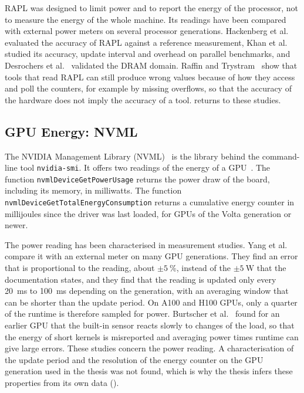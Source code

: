 RAPL was designed to limit power and to report the energy of the processor, not to measure the energy of the whole machine.
Its readings have been compared with external power meters on several processor generations.
Hackenberg et al.~\cite{hackenberg2013power} evaluated the accuracy of RAPL against a reference measurement, Khan et al.~\cite{khan2018rapl} studied its accuracy, update interval and overhead on parallel benchmarks, and Desrochers et al.~\cite{desrochers2016dram} validated the DRAM domain.
Raffin and Trystram~\cite{raffin2024dissecting} show that tools that read RAPL can still produce wrong values because of how they access and poll the counters, for example by missing overflows, so that the accuracy of the hardware does not imply the accuracy of a tool.
 returns to these studies.

\subsection{GPU Energy: NVML}\label{sec:nvml}

The NVIDIA Management Library (NVML)~\cite{nvml} is the library behind the command-line tool \texttt{nvidia-smi}.
It offers two readings of the energy of a GPU~\cite{nvmlapi}.
The function \texttt{nvmlDeviceGetPowerUsage} returns the power draw of the board, including its memory, in milliwatts.
The function \texttt{nvmlDeviceGetTotalEnergyConsumption} returns a cumulative energy counter in millijoules since the driver was last loaded, for GPUs of the Volta generation or newer.

The power reading has been characterised in measurement studies.
Yang et al.~\cite{yang2023parttime} compare it with an external meter on many GPU generations.
They find an error that is proportional to the reading, about $\pm\SI{5}{\percent}$, instead of the $\pm\SI{5}{\watt}$ that the documentation states, and they find that the reading is updated only every \SI{20}{\milli\second} to \SI{100}{\milli\second} depending on the generation, with an averaging window that can be shorter than the update period.
On A100 and H100 GPUs, only a quarter of the runtime is therefore sampled for power.
Burtscher et al.~\cite{burtscher2014k20} found for an earlier GPU that the built-in sensor reacts slowly to changes of the load, so that the energy of short kernels is misreported and averaging power times runtime can give large errors.
These studies concern the power reading.
A characterisation of the update period and the resolution of the energy counter on the GPU generation used in the thesis was not found, which is why the thesis infers these properties from its own data ().

